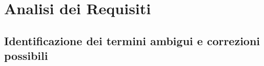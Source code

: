 \section{Analisi dei Requisiti}
%
%
\subsection*{Identificazione dei termini ambigui e correzioni possibili}
%
%
